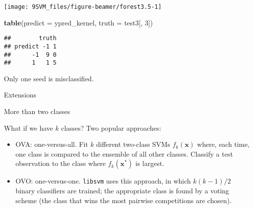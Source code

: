 \documentclass[10pt,ignorenonframetext,]{beamer}
\newenvironment{Shaded}{\begin{snugshade}}{\end{snugshade}}
\newcommand{\DataTypeTok}[1]{\textcolor[rgb]{0.13,0.29,0.53}{#1}}
\newcommand{\DecValTok}[1]{\textcolor[rgb]{0.00,0.00,0.81}{#1}}
\newcommand{\KeywordTok}[1]{\textcolor[rgb]{0.13,0.29,0.53}{\textbf{#1}}}
\newcommand{\NormalTok}[1]{#1}
\begin{document}
\begin{frame}

\scriptsize

\begin{center}\texttt{[image: 9SVM\_files/figure-beamer/forest3.5-1]} \end{center}

\end{frame}

\begin{frame}[fragile]

\scriptsize

\begin{Shaded}
\begin{Highlighting}[]
\KeywordTok{table}\NormalTok{(}\DataTypeTok{predict =}\NormalTok{ ypred_kernel, }\DataTypeTok{truth =}\NormalTok{ test3[, }\DecValTok{3}\NormalTok{])}
\end{Highlighting}
\end{Shaded}

\begin{verbatim}
##        truth
## predict -1 1
##      -1  9 0
##      1   1 5
\end{verbatim}

\normalsize

Only one seed is misclassified.

\end{frame}

\begin{frame}[fragile]{Extensions}
\protect\hypertarget{extensions}{}

\begin{block}{More than two classes}

\vspace{2mm}

What if we have \(k\) classes? Two popular approaches:

\begin{itemize}
\item
  OVA: one-versus-all. Fit \(k\) different two-class SVMs
  \(f_k({\boldsymbol x})\) where, each time, one class is compared to
  the ensemble of all other classes. Classify a test observation to the
  class where \(f_k({\boldsymbol x}^*)\) is largest.
\item
  OVO: one-versus-one. \texttt{libsvm} uses this approach, in which
  \(k(k-1)/2\) binary classifiers are trained; the appropriate class is
  found by a voting scheme (the class that wins the most pairwise
  competitions are chosen).
\end{itemize}

\end{block}

\end{frame}
\end{document}

